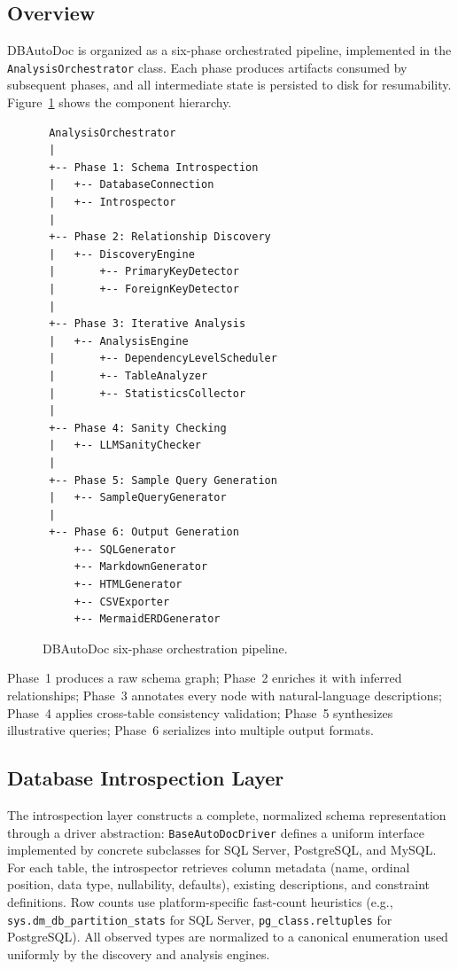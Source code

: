 \documentclass[twocolumn]{svjour3}
\begin{document}
\subsection{Overview}

DBAutoDoc is organized as a six-phase orchestrated pipeline, implemented in the \texttt{AnalysisOrchestrator} class. Each phase produces artifacts consumed by subsequent phases, and all intermediate state is persisted to disk for resumability. Figure~\ref{fig:pipeline} shows the component hierarchy.

\begin{figure}[t]
\begin{small}
\begin{verbatim}
 AnalysisOrchestrator
 |
 +-- Phase 1: Schema Introspection
 |   +-- DatabaseConnection
 |   +-- Introspector
 |
 +-- Phase 2: Relationship Discovery
 |   +-- DiscoveryEngine
 |       +-- PrimaryKeyDetector
 |       +-- ForeignKeyDetector
 |
 +-- Phase 3: Iterative Analysis
 |   +-- AnalysisEngine
 |       +-- DependencyLevelScheduler
 |       +-- TableAnalyzer
 |       +-- StatisticsCollector
 |
 +-- Phase 4: Sanity Checking
 |   +-- LLMSanityChecker
 |
 +-- Phase 5: Sample Query Generation
 |   +-- SampleQueryGenerator
 |
 +-- Phase 6: Output Generation
     +-- SQLGenerator
     +-- MarkdownGenerator
     +-- HTMLGenerator
     +-- CSVExporter
     +-- MermaidERDGenerator
\end{verbatim}
\end{small}
\caption{DBAutoDoc six-phase orchestration pipeline.}
\label{fig:pipeline}
\end{figure}

Phase~1 produces a raw schema graph; Phase~2 enriches it with inferred relationships; Phase~3 annotates every node with natural-language descriptions; Phase~4 applies cross-table consistency validation; Phase~5 synthesizes illustrative queries; Phase~6 serializes into multiple output formats.

\subsection{Database Introspection Layer}

The introspection layer constructs a complete, normalized schema representation through a driver abstraction: \texttt{BaseAutoDocDriver} defines a uniform interface implemented by concrete subclasses for SQL Server, PostgreSQL, and MySQL. For each table, the introspector retrieves column metadata (name, ordinal position, data type, nullability, defaults), existing descriptions, and constraint definitions. Row counts use platform-specific fast-count heuristics (e.g., \texttt{sys.dm\_db\_partition\_stats} for SQL Server, \texttt{pg\_class.reltuples} for PostgreSQL). All observed types are normalized to a canonical enumeration used uniformly by the discovery and analysis engines.
\end{document}

